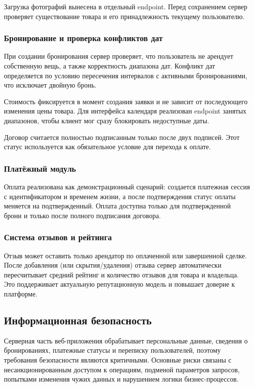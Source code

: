 Загрузка фотографий вынесена в отдельный endpoint. Перед сохранением сервер проверяет существование товара и его принадлежность текущему пользователю.

\subsubsection{Бронирование и проверка конфликтов дат}
При создании бронирования сервер проверяет, что пользователь не арендует собственную вещь, а также корректность диапазона дат. Конфликт дат определяется по условию пересечения интервалов с активными бронированиями, что исключает двойную бронь.

Стоимость фиксируется в момент создания заявки и не зависит от последующего изменения цены товара. Для интерфейса календаря реализован endpoint занятых диапазонов, чтобы клиент мог сразу блокировать недоступные даты.

Договор считается полностью подписанным только после двух подписей. Этот статус используется как обязательное условие для перехода к оплате.
\subsubsection{Платёжный модуль}
Оплата реализована как демонстрационный сценарий: создается платежная сессия с идентификатором и временем жизни, а после подтверждения статус оплаты меняется на подтвержденный. Оплата доступна только для подтвержденной брони и только после полного подписания договора.

\subsubsection{Система отзывов и рейтинга}
Отзыв может оставить только арендатор по оплаченной или завершенной сделке. После добавления (или скрытия/удаления) отзыва сервер автоматически пересчитывает средний рейтинг и количество отзывов для товара и владельца. Это поддерживает актуальную репутационную модель и повышает доверие к платформе.

\subsection{Информационная безопасность}
Серверная часть веб-приложения обрабатывает персональные данные, сведения о бронированиях, платежные статусы и переписку пользователей, поэтому требования безопасности являются критичными. Основные риски связаны с несанкционированным доступом к операциям, подменой параметров запросов, попытками изменения чужих данных и нарушением логики бизнес-процессов.

